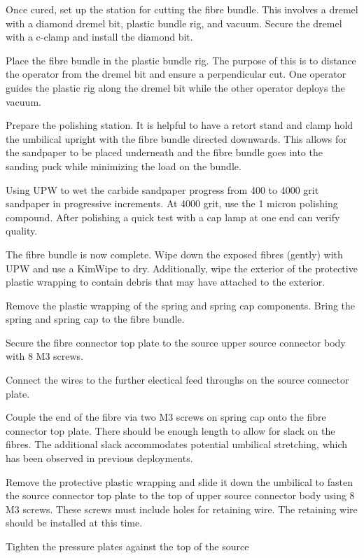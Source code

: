\documentclass[11pt]{article}
\begin{document}
\begin{answerlist}
\item Once cured, set up the station for cutting the fibre bundle. This involves a dremel with a diamond dremel bit, plastic bundle rig, and vacuum. Secure the dremel with a c-clamp and install the diamond bit.
\item Place the fibre bundle in the plastic bundle rig. The purpose of this is to distance the operator from the dremel bit and ensure a perpendicular cut. One operator guides the plastic rig along the dremel bit while the other operator deploys the vacuum.
\item Prepare the polishing station. It is helpful to have a retort stand and clamp hold the umbilical upright with the fibre bundle directed downwards. This allows for the sandpaper to be placed underneath and the fibre bundle goes into the sanding puck while minimizing the load on the bundle.
\item Using UPW to wet the carbide sandpaper progress from 400 to 4000 grit sandpaper in progressive increments. At 4000 grit, use the 1 micron polishing compound. After polishing a quick test with a cap lamp at one end can verify quality.
\item The fibre bundle is now complete. Wipe down the exposed fibres (gently) with UPW and use a KimWipe to dry. Additionally, wipe the exterior of the protective plastic wrapping to contain debris that may have attached to the exterior.
\item Remove the plastic wrapping of the spring and spring cap components. Bring the spring and spring cap to the fibre bundle.
\item Secure the fibre connector top plate to the source upper source connector body with 8 M3 screws.
\item Connect the wires to the further electical feed throughs on the source connector plate.
\item Couple the end of the fibre via two M3 screws on spring cap onto the fibre connector top plate. There should be enough length to allow for slack on the fibres. The additional slack accommodates potential umbilical stretching, which has been observed in previous deployments.
\item Remove the protective plastic wrapping and slide it down the umbilical to fasten the source connector top plate to the top of upper source connector body using 8 M3 screws. These screws must include holes for retaining wire. The retaining wire should be installed at this time.
\item Tighten the pressure plates against the top of the source

\end{answerlist}
\end{document}
